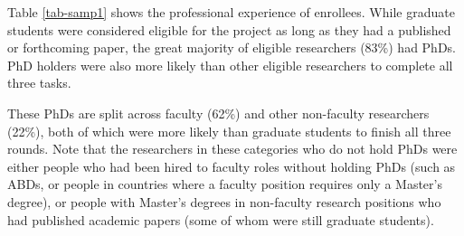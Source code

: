 \documentclass[
  letterpaper,
  DIV=11,
  numbers=noendperiod]{scrartcl}
\begin{document}
\begin{table}[!htbp] \centering \renewcommand*{\arraystretch}{1.1}\caption{Researcher Recruitment Source and Completion Confidence}\label{tab-samp1}
\end{table}

Table \ref{tab-samp1} shows the professional experience of enrollees.
While graduate students were considered eligible for the project as long
as they had a published or forthcoming paper, the great majority of
eligible researchers (83\%) had PhDs. PhD holders were also more likely
than other eligible researchers to complete all three tasks.

These PhDs are split across faculty (62\%) and other non-faculty
researchers (22\%), both of which were more likely than graduate
students to finish all three rounds. Note that the researchers in these
categories who do not hold PhDs were either people who had been hired to
faculty roles without holding PhDs (such as ABDs, or people in countries
where a faculty position requires only a Master's degree), or people
with Master's degrees in non-faculty research positions who had
published academic papers (some of whom were still graduate students).
\end{document}
